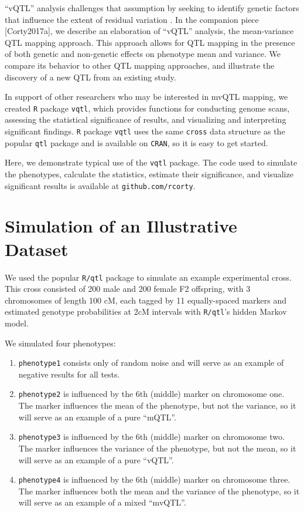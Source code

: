\documentclass{article}
\begin{document}
``vQTL'' analysis challenges that assumption by seeking to identify genetic factors that influence the extent of residual variation \citep{Ronnegard2011a,Ronnegard2012}.
In the companion piece [Corty2017a], we describe an elaboration of ``vQTL'' analysis, the mean-variance QTL mapping approach.
This approach allows for QTL mapping in the presence of both genetic and non-genetic effects on phenotype mean and variance.
We compare its behavior to other QTL mapping approaches, and illustrate the discovery of a new QTL from an existing study.

In support of other researchers who may be interested in mvQTL mapping, we created \texttt{R} package \texttt{vqtl}, which provides functions for conducting genome scans, assessing the statistical significance of results, and visualizing and interpreting significant findings.
\texttt{R} package \texttt{vqtl} uses the same \texttt{cross} data structure as the popular \texttt{qtl} package and is available on \texttt{CRAN}, so it is easy to get started.

Here, we demonstrate typical use of the \texttt{vqtl} package.
The code used to simulate the phenotypes, calculate the statistics, estimate their significance, and visualize significant results is available at \texttt{github.com/rcorty}.




\section*{Simulation of an Illustrative Dataset}

We used the popular \texttt{R/qtl} package to simulate an example experimental cross.
This cross consisted of 200 male and 200 female F2 offspring, with 3 chromosomes of length 100 cM, each tagged by 11 equally-spaced markers and estimated genotype probabilities at 2cM intervals with \texttt{R/qtl}'s hidden Markov model.

We simulated four phenotypes:

\begin{enumerate}
	\item \texttt{phenotype1} consists only of random noise and will serve as an example of negative results for all tests.
	\item \texttt{phenotype2} is influenced by the 6th (middle) marker on chromosome one.  The marker influences the mean of the phenotype, but not the variance, so it will serve as an example of a pure ``mQTL''.
	\item \texttt{phenotype3} is influenced by the 6th (middle) marker on chromosome two.  The marker influences the variance of the phenotype, but not the mean, so it will serve as an example of a pure ``vQTL''.
	\item \texttt{phenotype4} is influenced by the 6th (middle) marker on chromosome three.  The marker influences both the mean and the variance of the phenotype, so it will serve as an example of a mixed ``mvQTL''.
\end{enumerate}
\end{document}
